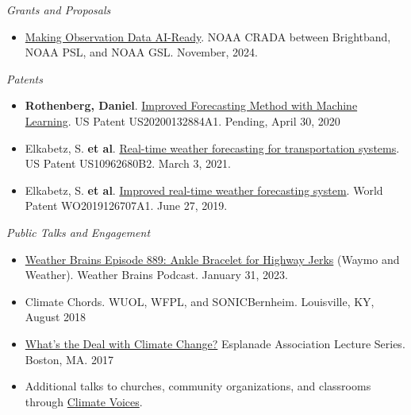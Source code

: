 \documentclass[11pt,letterpaper]{article}
\begin{document}
\bigskip
\emph{Grants and Proposals}
\medskip
\begin{itemize}[itemindent=-10pt]

 \item \href{https://techpartnerships.noaa.gov/tpo_partnership/making-observation-data-ai-ready/}{Making Observation Data AI-Ready}. NOAA CRADA between Brightband, NOAA PSL, and NOAA GSL. November, 2024.

\end{itemize}

\bigskip
\emph{Patents}
\medskip
\begin{itemize}[itemindent=-10pt]

 \item \textbf{Rothenberg, Daniel}. \href{https://patents.google.com/patent/US20200132884A1/en}{Improved Forecasting Method with Machine Learning}. US Patent US20200132884A1. Pending, April 30, 2020

 \item Elkabetz, S. \textbf{et al}. \href{https://patents.google.com/patent/US10962680B2/en}{Real-time weather forecasting for transportation systems}. US Patent US10962680B2. March 3, 2021.

 \item Elkabetz, S. \textbf{et al}. \href{https://patents.google.com/patent/WO2019126707A1/}{Improved real-time weather forecasting system}. World Patent WO2019126707A1. June 27, 2019.
 
\end{itemize}


\bigskip
\emph{Public Talks and Engagement}
\medskip
\begin{itemize}[itemindent=-10pt]

 \item \href{https://weatherbrains.com/?p=10227}{Weather Brains Episode 889: Ankle Bracelet for Highway Jerks} (Waymo and Weather). Weather Brains Podcast. January 31, 2023.

 \item Climate Chords. WUOL, WFPL, and SONICBernheim. Louisville, KY, August 2018

 \item \href{https://docs.google.com/presentation/d/158WNGamjcRgUr1TvOVVixOQXRt1uc2kUyYe5a6D9ICA/edit?usp=drive_web}{What's the Deal with Climate Change?} Esplanade Association Lecture Series. Boston, MA. 2017

 \item Additional talks to churches, community organizations, and classrooms through \href{https://climatevoices.org/}{Climate Voices}.

\end{itemize}
\end{document}
